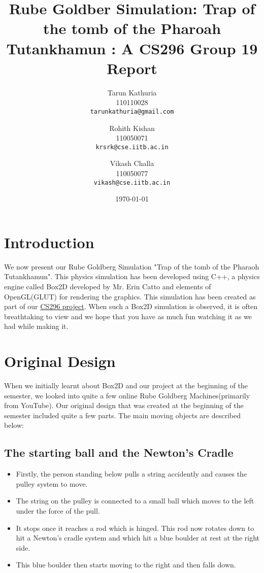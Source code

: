 \documentclass[11pt]{article}
\begin{document}
\title{Rube Goldber Simulation: Trap of the tomb of the Pharoah Tutankhamun : A CS296 Group 19 Report}
\author{Tarun Kathuria \\ 110110028 \\ \texttt{tarunkathuria@gmail.com} \and Rohith Kishan \\ 110050071 \\ \texttt{krsrk@cse.iitb.ac.in} \and Vikash Challa \\ 110050077 \\ \texttt{vikash@cse.iitb.ac.in}}
\date{\today}
\maketitle

\section{Introduction}

We now present our Rube Goldberg Simulation\cite{wikirgm} "Trap of the tomb of the Pharaoh Tutankhamun". 
This physics simulation has been developed using C++, a physics engine called Box2D developed by Mr. Erin Catto and elements of OpenGL(GLUT) for rendering the graphics. This simulation has been created as part of our \underline{CS296 project}. When such a Box2D simulation is observed, it is often breathtaking to view and we hope that you have as much fun watching it as we had while making it.


\section{Original Design}

When we initially learnt about Box2D and our project at the beginning of the semester, we looked into quite a few online Rube Goldberg Machines(primarily from YouTube\cite{rubegoldbergYouTube}). Our original design that was created at the beginning of the semester included quite a few parts. The main moving objects are described below:

\subsection{The starting ball and the Newton's Cradle}

\begin{itemize}
	\item Firstly, the person standing below pulls a string accidently and causes the pulley system to move. 
	\item The string on the pulley is connected to a small ball which moves to the left under the force of the pull. 
	\item It stops once it reaches a rod which is hinged. This rod now rotates down to hit a Newton's cradle system and which hit a blue boulder at rest at the right side. 
	\item This blue boulder then starts moving to the right and then falls down.
\end{itemize}
\end{document}
